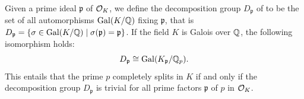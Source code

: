Given a prime ideal $\mathfrak{p}$ of $\mathcal{O}_K$, we define the decomposition group $D_{\mathfrak{p}}$ of to be the set of all automorphisms $\operatorname{Gal}(K/\mathbb{Q})$ fixing $\mathfrak{p}$, that is $ D_{\mathfrak{p}} = \{ \sigma \in \operatorname{Gal}(K/\mathbb{Q}) \mid \sigma(\mathfrak{p}) = \mathfrak{p} \}$.
If the field $K$ is Galois over $\mathbb{Q}$, the following isomorphism holds:
\[ D_{\mathfrak{p}} \cong \operatorname{Gal}(K_{\mathfrak{p}}/\mathbb{Q}_p). \]
This entails that the prime $p$ completely splits in $K$ if and only if the decomposition group $D_{\mathfrak{p}}$ is trivial for all prime factors $\mathfrak{p}$ of $p$ in $\mathcal{O}_K$.
